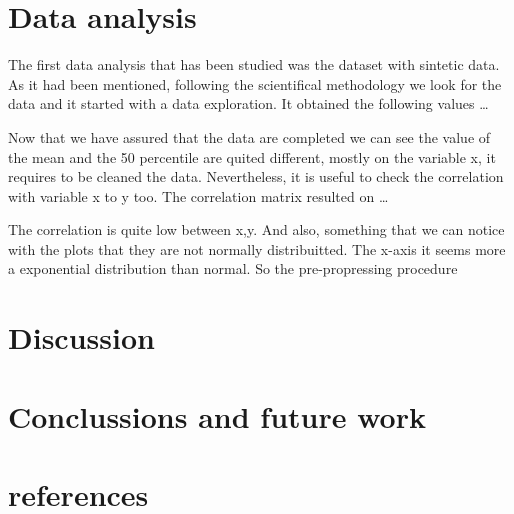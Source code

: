 \documentclass{article}
\begin{document}
\section{Data analysis}
The first data analysis that has been studied was the dataset with sintetic data. As it had been mentioned, following the scientifical methodology we look for the data and it started with a data exploration.
It obtained the following values \dots
\begin{table}[h]

\end{table}

Now that we have assured that the data are completed we can see the value of the mean and the 50 percentile are quited different, mostly on the variable x, it requires to be cleaned the data. Nevertheless, it is useful to check the correlation with variable x to y too.
The correlation matrix resulted on \dots

The correlation is quite low between x,y.
And also, something that we can notice with the plots that they are not normally distribuitted. The x-axis it seems more a exponential distribution than normal.
So the pre-propressing procedure 
\section{Discussion}
\section{Conclussions and future work}
\section{references}
\end{document}
